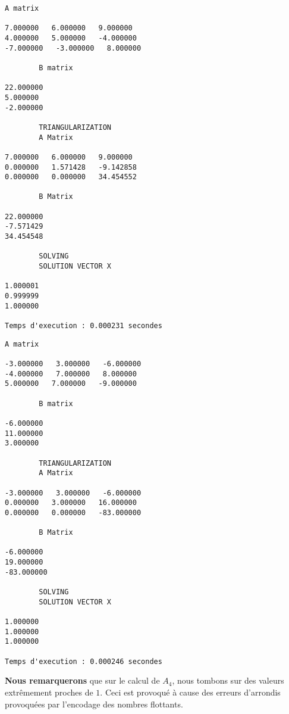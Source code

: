 \begin{lstlisting}[caption={$A_4X=B$} results, basicstyle=\fontsize{4}{6}\selectfont]
		A matrix 

7.000000   6.000000   9.000000   
4.000000   5.000000   -4.000000   
-7.000000   -3.000000   8.000000   

		B matrix 

22.000000   
5.000000   
-2.000000   

		TRIANGULARIZATION 
		A Matrix 

7.000000   6.000000   9.000000   
0.000000   1.571428   -9.142858   
0.000000   0.000000   34.454552   

		B Matrix 

22.000000   
-7.571429   
34.454548   

		SOLVING 
		SOLUTION VECTOR X 

1.000001   
0.999999   
1.000000   

Temps d'execution : 0.000231 secondes
\end{lstlisting}
\begin{lstlisting}[caption={$A_6X=B$} results, basicstyle=\fontsize{4}{6}\selectfont]
		A matrix 

-3.000000   3.000000   -6.000000   
-4.000000   7.000000   8.000000   
5.000000   7.000000   -9.000000   

		B matrix 

-6.000000   
11.000000   
3.000000   

		TRIANGULARIZATION 
		A Matrix 

-3.000000   3.000000   -6.000000   
0.000000   3.000000   16.000000   
0.000000   0.000000   -83.000000   

		B Matrix 

-6.000000   
19.000000   
-83.000000   

		SOLVING 
		SOLUTION VECTOR X 

1.000000   
1.000000   
1.000000   

Temps d'execution : 0.000246 secondes
\end{lstlisting}

\textbf{Nous remarquerons} que sur le calcul de $A_4$, nous tombons sur des valeurs extrêmement proches de $1$. Ceci est provoqué à cause des erreurs d'arrondis provoquées par l'encodage des nombres flottants.     